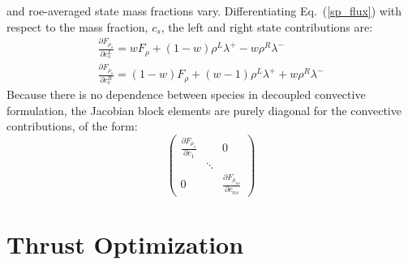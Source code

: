 \documentclass{article}   	%
\begin{document}
and roe-averaged state mass fractions vary.  Differentiating Eq.~(\ref{sp_flux})
with respect to the mass fraction, $c_s$, the left and right state contributions
are:
\begin{gather}
	\frac{\partial F_{\rho_s}}{\partial c^L_s} = wF_\rho+(1-w)\rho^L\lambda^+ - w\rho^R\lambda^- \\
	\frac{\partial F_{\rho_s}}{\partial c^R_s} = (1-w)F_\rho+(w-1)\rho^L\lambda^+ + w\rho^R\lambda^-
\end{gather}
Because there is no dependence between species in decoupled convective
formulation, the Jacobian block elements are purely diagonal for the convective
contributions, of the form:
\begin{equation}
	\begin{pmatrix}
		\frac{\partial F_{\rho_1}}{\partial c_1} & & 0 \\
		 & \ddots &  \\
		 0 & & \frac{\partial F_{\rho_{ns}}}{\partial c_{ns}}
	\end{pmatrix}
\end{equation}

\section{Thrust Optimization}
\end{document}
